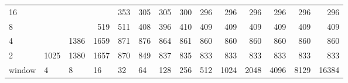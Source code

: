 \begin{table}[]
{\begin{tabular}{l|rrrrrrrrrrrrr}
			\multicolumn{1}{|l|}{16} &  &  &  & \cellcolor[HTML]{99E600}353 & \cellcolor[HTML]{99E600}305 & \cellcolor[HTML]{99E600}305 & \cellcolor[HTML]{99E600}300 & \cellcolor[HTML]{99E600}296 & \cellcolor[HTML]{99E600}296 & \cellcolor[HTML]{99E600}296 & \cellcolor[HTML]{99E600}296 & \cellcolor[HTML]{99E600}296 & \cellcolor[HTML]{99E600}296 \\ \cline{1-1}
			\multicolumn{1}{|l|}{8} &  &  & \cellcolor[HTML]{E69900}519 & \cellcolor[HTML]{E69900}511 & \cellcolor[HTML]{E69900}408 & \cellcolor[HTML]{99E600}396 & \cellcolor[HTML]{E69900}410 & \cellcolor[HTML]{E69900}409 & \cellcolor[HTML]{E69900}409 & \cellcolor[HTML]{E69900}409 & \cellcolor[HTML]{E69900}409 & \cellcolor[HTML]{E69900}409 & \cellcolor[HTML]{E69900}409 \\ \cline{1-1}
			\multicolumn{1}{|l|}{4} &  & \cellcolor[HTML]{4C00E6}1386 & \cellcolor[HTML]{4C00E6}1659 & \cellcolor[HTML]{9900E6}871 & \cellcolor[HTML]{9900E6}876 & \cellcolor[HTML]{9900E6}864 & \cellcolor[HTML]{9900E6}861 & \cellcolor[HTML]{9900E6}860 & \cellcolor[HTML]{9900E6}860 & \cellcolor[HTML]{9900E6}860 & \cellcolor[HTML]{9900E6}860 & \cellcolor[HTML]{9900E6}860 & \cellcolor[HTML]{9900E6}860 \\ \cline{1-1}
			\multicolumn{1}{|l|}{2} & \cellcolor[HTML]{4C00E6}1025 & \cellcolor[HTML]{4C00E6}1380 & \cellcolor[HTML]{4C00E6}1657 & \cellcolor[HTML]{9900E6}870 & \cellcolor[HTML]{9900E6}849 & \cellcolor[HTML]{9900E6}837 & \cellcolor[HTML]{9900E6}835 & \cellcolor[HTML]{9900E6}833 & \cellcolor[HTML]{9900E6}833 & \cellcolor[HTML]{9900E6}833 & \cellcolor[HTML]{9900E6}833 & \cellcolor[HTML]{9900E6}833 & \cellcolor[HTML]{9900E6}833 \\ \cline{1-1}
			window & \multicolumn{1}{l|}{4} & \multicolumn{1}{l|}{8} & \multicolumn{1}{l|}{16} & \multicolumn{1}{l|}{32} & \multicolumn{1}{l|}{64} & \multicolumn{1}{l|}{128} & \multicolumn{1}{l|}{256} & \multicolumn{1}{l|}{512} & \multicolumn{1}{l|}{1024} & \multicolumn{1}{l|}{2048} & \multicolumn{1}{l|}{4096} & \multicolumn{1}{l|}{8129} & \multicolumn{1}{l|}{16384} \\ \cline{2-14}
		\end{tabular}
	}
\end{table}

